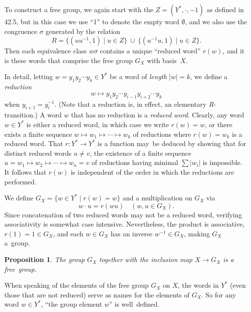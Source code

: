 \documentclass{surv-l}
\numberwithin{equation}{section}
\numberwithin{table}{section}
\numberwithin{figure}{section}
\theoremstyle{plain}
\newtheorem{proposition}[equation]{Proposition}
\theoremstyle{definition}
\begin{document}
To construct a free group, we again start with the $Z=(Y^{\ast},\cdot,
-1)$ as defined in 42.5, but in this case we use ``1'' to denote
the empty word $\emptyset$, and we also use the congruence
$\sigma$ generated by the relation
\[
R=\{(uu^{-1},1)\mid u\in Z\}\ \cup\ \{(u^{-1}u, 1)\mid u\in Z\}.
\]
Then each equivalence class $ w\sigma$ contains a unique ``reduced
word'' $r(w)$, and it is these words that
comprise the free group $G_{X}$ with basis~$X$.

In detail, letting $w=y_{1}y_{2}\cdots y_{k}\in Y^{\ast}$ be a
word of \emph{length} $|w|=k$, we define a
\emph{reduction}
\[
w\mapsto y_{1}y_{2}\cdots y_{i-1}y_{i+2}\cdots y_{k}
\]
when $y_{i+1}=y_{i}^{-1}$. (Note that a reduction is, in effect,
an elementary \emph{R}-transition.) A word $w$ that has no
reduction is a \emph{reduced word}. Clearly, any word $w\in
Y^{\ast}$ is either a reduced word, in which case we write
$r(w)=w$, or there exists a finite sequence $w\mapsto
w_{1}\mapsto\cdots\mapsto w_{k}$ of reductions where $r(w)=w_{k}$
is a reduced word. That $r : Y^{\ast}\rightarrow Y^{\ast}$ is a
function may~be deduced by showing that for distinct reduced words
$u\neq v$, the existence of a finite sequence $u=w_{1}\mapsto
w_{2}\mapsto\cdots\mapsto w_{n}=v$ of reductions having minimal
$\sum|w_{i}|$ is impossible. It follows that $r(w)$ is independent
of the order in which the reductions are performed.

We define $G_{X}=\{w\in Y^{\ast}\mid r(w)=w\}$ and a
multiplication on $G_{X}$ via
\[
w\cdot u=r(wu)\quad (w, u\in G_{X}).
\]
Since concatenation of two reduced words may not be a reduced
word, verifying associativity is somewhat case intensive.
Nevertheless, the product is associative, $r(1)=1\in G_{X}$, and
each $w\in G_{X}$ has an inverse $w^{-1}\in G_{X}$, making $G_{X}$
a~group.

\begin{proposition}\label{prop9.42.9}
The group $G_{X}$ together with the inclusion map $X\rightarrow
G_{X}$ is a free~group.
\end{proposition}

When speaking of the elements of the free group $G_{X}$ on $X$,
the words in $Y^{\ast}$ (even those that are not reduced) serve as
names for the elements of $G_{X}$. So for any word $w\in
Y^{\ast}$, ``the group element $w$'' is well~defined.
\end{document}
